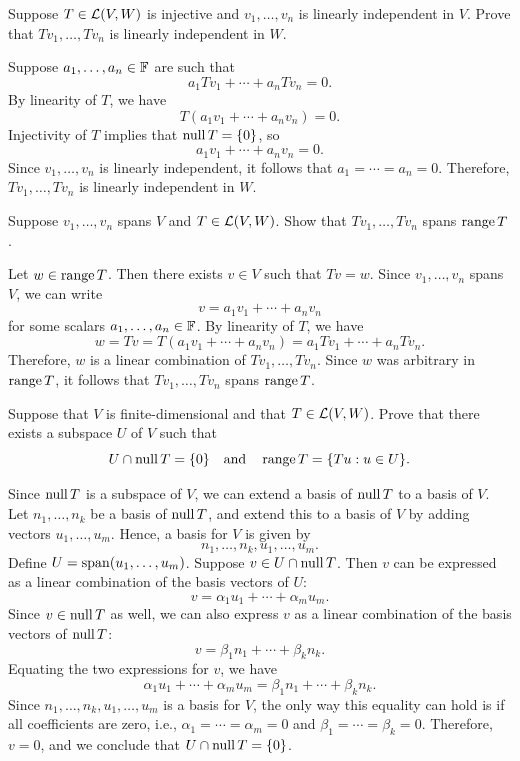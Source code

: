 \begin{exc}
\begin{exercise}
Suppose $T\in\mathcal{L}(V,W)$ is injective and $v_1,\dots,v_n$ is linearly
independent in $V$. Prove that $Tv_1,\dots,Tv_n$ is linearly independent in
$W$.
\end{exercise}
\begin{solution}
Suppose $a_1,\dots,a_n\in\mathbb{F}$ are such that
\[ a_1Tv_1+\cdots+a_nTv_n=0. \]
By linearity of $T$, we have
\[ T(a_1v_1+\cdots+a_nv_n)=0. \]
Injectivity of $T$ implies that $\operatorname{null} T=\{0\}$, so
\[ a_1v_1+\cdots+a_nv_n=0. \]
Since $v_1,\dots,v_n$ is linearly independent, it follows that
$a_1=\cdots=a_n=0$. Therefore, $Tv_1,\dots,Tv_n$ is linearly independent in
$W$.
\end{solution}

\begin{exercise}
Suppose $v_1,\dots,v_n$ spans $V$ and $T\in\mathcal{L}(V,W)$. Show that
$Tv_1,\dots,Tv_n$ spans $\operatorname{range} T$.
\end{exercise}
\begin{solution}
Let $w\in\operatorname{range} T$. Then there exists $v\in V$ such that $Tv=w$. Since
$v_1,\dots,v_n$ spans $V$, we can write
\[ v=a_1v_1+\cdots+a_nv_n \]
for some scalars $a_1,\dots,a_n\in\mathbb{F}$. By linearity of $T$, we have
\[ w=Tv=T(a_1v_1+\cdots+a_nv_n)=a_1Tv_1+\cdots+a_nTv_n. \]
Therefore, $w$ is a linear combination of $Tv_1,\dots,Tv_n$. Since $w$ was
arbitrary in $\operatorname{range} T$, it follows that $Tv_1,\dots,Tv_n$ spans $\operatorname{range} T$.
\end{solution}

\begin{exercise}
Suppose that $V$ is finite-dimensional and that $T\in\mathcal{L}(V,W)$. Prove that
there exists a subspace $U$ of $V$ such that
\[ U\cap\operatorname{null} T=\{0\} \quad\text{and}\quad \operatorname{range} T=\{Tu : u\in U\}. \]
\end{exercise}
\begin{solution}

Since $\operatorname{null} T$ is a subspace of $V$, we can extend a basis of $\operatorname{null} T$ to a
basis of $V$. Let $n_1,\dots,n_k$ be a basis of $\operatorname{null} T$, and extend this to
a basis of $V$ by adding vectors $u_1,\dots,u_m$. Hence, a basis for $V$ is
given by
\[ n_1,\dots,n_k,u_1,\dots,u_m. \]
Define $U=\operatorname{span}(u_1,\dots,u_m)$. Suppose $v\in U\cap\operatorname{null} T$. Then $v$ can be
expressed as a linear combination of the basis vectors of $U$:
\[ v=\alpha_1u_1+\cdots+\alpha_mu_m. \]
Since $v\in\operatorname{null} T$ as well, we can also express $v$ as a linear combination
of the basis vectors of $\operatorname{null} T$:
\[ v=\beta_1n_1+\cdots+\beta_kn_k. \]
Equating the two expressions for $v$, we have
\[ \alpha_1u_1+\cdots+\alpha_mu_m=\beta_1n_1+\cdots+\beta_kn_k. \]
Since $n_1,\dots,n_k,u_1,\dots,u_m$ is a basis for $V$, the only way this
equality can hold is if all coefficients are zero, i.e.,
$\alpha_1=\cdots=\alpha_m=0$ and $\beta_1=\cdots=\beta_k=0$. Therefore,
$v=0$, and we conclude that $U\cap\operatorname{null} T=\{0\}$.


\end{solution}
\end{exc}
